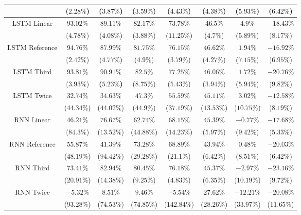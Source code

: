 \begin{table}[!ht]
{\begin{tabular}{|c|c|c|c|c|c|c|c|}
			 & ($2.28\%$) & ($3.87\%$) & ($3.59\%$) & ($4.43\%$) & ($4.38\%$) & ($5.93\%$) & ($6.42\%$) \\ \hline
			\multirow{2}{*}{LSTM Linear} & $93.02\%$ & $89.11\%$ & $82.17\%$ & $73.78\%$ & $46.5\%$ & $4.9\%$ & $-18.43\%$ \\
			 & ($4.78\%$) & ($4.08\%$) & ($3.88\%$) & ($11.25\%$) & ($4.7\%$) & ($5.89\%$) & ($8.17\%$) \\ \hline
			\multirow{2}{*}{LSTM Reference} & $94.76\%$ & $87.99\%$ & $81.75\%$ & $76.15\%$ & $46.62\%$ & $1.94\%$ & $-16.92\%$ \\
			 & ($2.42\%$) & ($4.77\%$) & ($4.9\%$) & ($3.79\%$) & ($4.27\%$) & ($7.15\%$) & ($6.95\%$) \\ \hline
			\multirow{2}{*}{LSTM Third} & $93.81\%$ & $\mathbf{90.91\%}$ & $82.5\%$ & $77.25\%$ & $46.06\%$ & $1.72\%$ & $-20.76\%$ \\
			 & ($3.93\%$) & \textbf{(}$\mathbf{5.23\%}$\textbf{)} & ($8.75\%$) & ($5.43\%$) & ($3.94\%$) & ($5.94\%$) & ($9.82\%$) \\ \hline
			\multirow{2}{*}{LSTM Twice} & $32.74\%$ & $34.63\%$ & $47.3\%$ & $55.59\%$ & $45.11\%$ & $3.02\%$ & $-12.58\%$ \\
			 & ($44.34\%$) & ($44.02\%$) & ($44.9\%$) & ($37.19\%$) & ($13.53\%$) & ($10.75\%$) & ($8.19\%$) \\ \hline
			\multirow{2}{*}{RNN Linear} & $46.21\%$ & $76.67\%$ & $62.74\%$ & $68.15\%$ & $45.39\%$ & $-0.77\%$ & $-17.68\%$ \\
			 & ($84.3\%$) & ($13.52\%$) & ($44.88\%$) & ($14.23\%$) & ($5.97\%$) & ($9.42\%$) & ($5.33\%$) \\ \hline
			\multirow{2}{*}{RNN Reference} & $55.87\%$ & $41.39\%$ & $73.28\%$ & $68.89\%$ & $43.94\%$ & $0.48\%$ & $-20.03\%$ \\
			 & ($48.19\%$) & ($94.42\%$) & ($29.28\%$) & ($21.1\%$) & ($6.42\%$) & ($8.51\%$) & ($6.42\%$) \\ \hline
			\multirow{2}{*}{RNN Third} & $73.41\%$ & $82.94\%$ & $80.45\%$ & $76.18\%$ & $45.37\%$ & $-2.97\%$ & $-23.16\%$ \\
			 & ($20.91\%$) & ($14.38\%$) & ($9.25\%$) & ($4.83\%$) & ($6.35\%$) & ($10.19\%$) & ($9.72\%$) \\ \hline
			\multirow{2}{*}{RNN Twice} & $-5.32\%$ & $8.51\%$ & $9.46\%$ & $-5.54\%$ & $27.62\%$ & $-12.21\%$ & $-20.08\%$ \\
			 & ($93.28\%$) & ($74.53\%$) & ($74.85\%$) & ($142.84\%$) & ($28.26\%$) & ($33.97\%$) & ($11.65\%$) \\ \hline

\end{tabular}}
\end{table}
